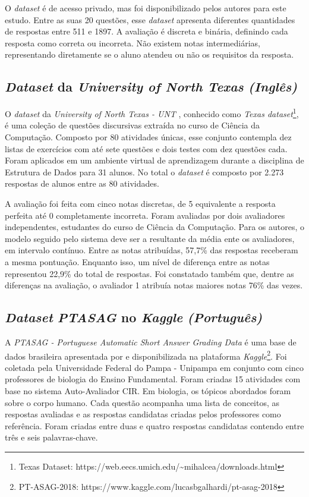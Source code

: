 O \textit{dataset} é de acesso privado, mas foi disponibilizado pelos autores para este estudo. Entre as suas 20 questões, esse \textit{dataset} apresenta diferentes quantidades de respostas entre 511 e 1897. A avaliação é discreta e binária, definindo cada resposta como correta ou incorreta. Não existem notas intermediárias, representando diretamente se o aluno atendeu ou não os requisitos da resposta. 


\subsection{\textit{Dataset} da \textit{University of North Texas} \textit{(Inglês)}}
\label{ntexasunv-db}

O \textit{dataset} da \textit{University of North Texas - UNT} \cite{mohler2011}, conhecido como \textit{Texas dataset}\footnote{Texas Dataset: https://web.eecs.umich.edu/{\textasciitilde}mihalcea/downloads.html}, é uma coleção de questões discursivas extraída no curso de Ciência da Computação. Composto por 80 atividades únicas, esse conjunto contempla dez listas de exercícios com até sete questões e dois testes com dez questões cada. Foram aplicados em um ambiente virtual de aprendizagem durante a disciplina de Estrutura de Dados para 31 alunos. No total o \textit{dataset} é composto por 2.273 respostas de alunos entre as 80 atividades.

A avaliação foi feita com cinco notas discretas, de 5 equivalente a resposta perfeita até 0 completamente incorreta. Foram avaliadas por dois avaliadores independentes, estudantes do curso de Ciência da Computação. Para os autores, o modelo seguido pelo sistema deve ser a resultante da média ente os avaliadores, em intervalo contínuo. Entre as notas atribuídas, 57,7\% das respostas receberam a mesma pontuação. Enquanto isso, um nível de diferença entre as notas representou 22,9\% do total de respostas. Foi constatado também que, dentre as diferenças na avaliação, o avaliador 1 atribuía notas maiores notas 76\% das vezes.

\subsection{\textit{Dataset} \textit{PTASAG} no \textit{Kaggle} \textit{(Português)}}
\label{ptasag-db}

A \textit{PTASAG - Portuguese Automatic Short Answer Grading Data} é uma base de dados brasileira apresentada por \cite{galhardi2018b} e disponibilizada na plataforma \textit{Kaggle}\footnote{PT-ASAG-2018: https://www.kaggle.com/lucasbgalhardi/pt-asag-2018}. Foi coletada pela Universidade Federal do Pampa - Unipampa em conjunto com cinco professores de biologia do Ensino Fundamental. Foram criadas 15 atividades com base no sistema Auto-Avaliador CIR. Em biologia, os tópicos abordados foram sobre o corpo humano. Cada questão acompanha uma lista de conceitos, as respostas avaliadas e as respostas candidatas criadas pelos professores como referência. Foram criadas entre duas e quatro respostas candidatas contendo entre três e seis palavras-chave.

